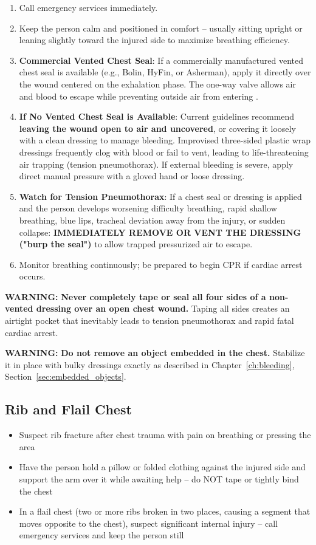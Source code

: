 \begin{enumerate}[leftmargin=*]
\item Call emergency services immediately.
\item Keep the person calm and positioned in comfort -- usually sitting upright or leaning slightly toward the injured side to maximize breathing efficiency.
\item \textbf{Commercial Vented Chest Seal}: If a commercially manufactured vented chest seal is available (e.g., Bolin, HyFin, or Asherman), apply it directly over the wound centered on the exhalation phase. The one-way valve allows air and blood to escape while preventing outside air from entering \cite{aha_arc_2024}.
\item \textbf{If No Vented Chest Seal is Available}: Current guidelines recommend \textbf{leaving the wound open to air and uncovered}, or covering it loosely with a clean dressing to manage bleeding. Improvised three-sided plastic wrap dressings frequently clog with blood or fail to vent, leading to life-threatening air trapping (tension pneumothorax). If external bleeding is severe, apply direct manual pressure with a gloved hand or loose dressing.
\item \textbf{Watch for Tension Pneumothorax}: If a chest seal or dressing is applied and the person develops worsening difficulty breathing, rapid shallow breathing, blue lips, tracheal deviation away from the injury, or sudden collapse: \textbf{IMMEDIATELY REMOVE OR VENT THE DRESSING ("burp the seal")} to allow trapped pressurized air to escape.
\item Monitor breathing continuously; be prepared to begin CPR if cardiac arrest occurs.
\end{enumerate}

\textbf{WARNING:} \textbf{Never completely tape or seal all four sides of a non-vented dressing over an open chest wound.} Taping all sides creates an airtight pocket that inevitably leads to tension pneumothorax and rapid fatal cardiac arrest.

\textbf{WARNING:} \textbf{Do not remove an object embedded in the chest.} Stabilize it in place with bulky dressings exactly as described in Chapter~\ref{ch:bleeding}, Section~\ref{sec:embedded_objects}.

\subsection{Rib and Flail Chest}

\begin{itemize}[leftmargin=*]
  \item Suspect rib fracture after chest trauma with pain on breathing or pressing the area
  \item Have the person hold a pillow or folded clothing against the injured side and support the arm over it while awaiting help -- do NOT tape or tightly bind the chest
  \item In a flail chest (two or more ribs broken in two places, causing a segment that moves opposite to the chest), suspect significant internal injury -- call emergency services and keep the person still
\end{itemize}

